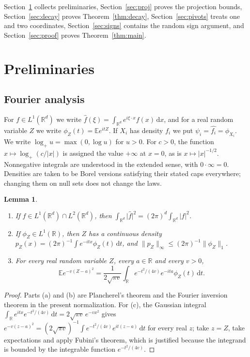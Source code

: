\documentclass[11pt]{amsart}
\numberwithin{equation}{section}
\newtheorem{lemma}[theorem]{Lemma}
\theoremstyle{definition}
\theoremstyle{remark}
\newcommand{\R}{\mathbb R}
\newcommand{\E}{\mathbb E}
\newcommand{\1}{\mathbf 1}
\newcommand{\dd}{\,\mathrm d}
\newcommand{\logp}{\log_+}
\newcommand{\norm}[1]{\lVert #1\rVert}
\newcommand{\abs}[1]{\lvert #1\rvert}
\begin{document}
Section~\ref{sec:prelim} collects preliminaries, Section~\ref{sec:proj} proves the projection bounds, Section~\ref{sec:decay} proves Theorem~\ref{thm:decay}, Section~\ref{sec:pivots} treats one and two coordinates, Section~\ref{sec:signs} contains the random sign argument, and Section~\ref{sec:proof} proves Theorem~\ref{thm:main}.

\section{Preliminaries}\label{sec:prelim}

\subsection{Fourier analysis}
For $f\in L^1(\R^d)$ we write $\widehat f(\xi)=\int_{\R^d}e^{i\xi\cdot x}f(x)\dd x$, and for a real random variable $Z$ we write $\phi_Z(t)=\E e^{itZ}$. If $X_i$ has density $f_i$ we put $\psi_i=\widehat{f_i}=\phi_{X_i}$. We write $\logp u=\max(0,\log u)$ for $u>0$. For $c>0$, the function $x\mapsto\logp(c/\abs x)$ is assigned the value $+\infty$ at $x=0$, as is $x\mapsto\abs x^{-1/2}$. Nonnegative integrals are understood in the extended sense, with $0\cdot\infty=0$. Densities are taken to be Borel versions satisfying their stated caps everywhere; changing them on null sets does not change the laws.

\begin{lemma}\label{lem:fourier}
\begin{enumerate}
\item[(a)] If $f\in L^1(\R^d)\cap L^2(\R^d)$, then $\int_{\R^d}\abs{\widehat f}^2=(2\pi)^d\int_{\R^d}\abs f^2$.
\item[(b)] If $\phi_Z\in L^1(\R)$, then $Z$ has a continuous density $p_Z(x)=(2\pi)^{-1}\int e^{-itx}\phi_Z(t)\dd t$, and $\norm{p_Z}_\infty\le(2\pi)^{-1}\norm{\phi_Z}_1$.
\item[(c)] For every real random variable $Z$, every $a\in\R$ and every $v>0$,
\[
\E e^{-v(Z-a)^2}=\frac1{2\sqrt{\pi v}}\int_\R e^{-t^2/(4v)}e^{-ita}\phi_Z(t)\dd t.
\]
\end{enumerate}
\end{lemma}

\begin{proof}
Parts (a) and (b) are Plancherel's theorem and the Fourier inversion theorem in the present normalization. For (c), the Gaussian integral $\int_\R e^{itx}e^{-t^2/(4v)}\dd t=2\sqrt{\pi v}\,e^{-vx^2}$ gives $e^{-v(z-a)^2}=(2\sqrt{\pi v})^{-1}\int e^{-t^2/(4v)}e^{it(z-a)}\dd t$ for every real $z$; take $z=Z$, take expectations and apply Fubini's theorem, which is justified because the integrand is bounded by the integrable function $e^{-t^2/(4v)}$.
\end{proof}
\end{document}
